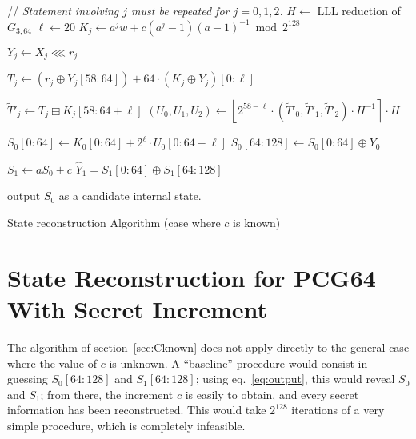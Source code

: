 \documentclass[submission,svgnames,journal=tosc]{iacrtrans}
\begin{document}
\begin{algorithm}
\begin{algorithmic}[1]
  \State // \emph{Statement involving $j$ must be repeated for $j=0, 1, 2$.}
  \State $H \gets$ LLL reduction of $G_{3,64}$
  \State $\ell \gets 20$
   
    \State $K_j \gets a^j w + c (a^j - 1)(a-1)^{-1} \bmod 2^{128}$    
    
     
    
    \State $Y_j \gets X_j \lll r_j$ 
    
    \State $T_j \gets \left(r_j \oplus Y_j[58:64]\right) +  64 \cdot \left(K_j \oplus Y_j\right)[0:\ell]$  
    
    \State $\widetilde T'_j \gets T_j \boxminus K_j[58:64+\ell]$  
    \State $(U_0, U_1, U_2) \gets \left\lfloor 2^{58-\ell} \cdot (\widetilde T'_0, \widetilde T'_1, \widetilde T'_2) \cdot  H^{-1} \right\rceil \cdot H$ 

    \State $S_0[0:64] \gets  K_0[0:64] + 2^{\ell} \cdot U_0[0:64-\ell]$ 
    \State $S_0[64:128] \gets S_0[0:64] \oplus Y_0$ 
    
    \State $S_1 \gets a  S_0 + c$ 
    \State $\widehat{Y}_1 =  S_1[0:64] \oplus  S_1[64:128]$
    
     
    \State output $S_0$ as a candidate internal state.
    \EndIf
    \EndFor
    \EndFor
    \EndProcedure
  \end{algorithmic}
  \caption{State reconstruction Algorithm (case where $c$ is known)}
  \label{algo:known}
\end{algorithm}
  
\section{State Reconstruction for \textsf{PCG64} With Secret Increment}
\label{sec:Cunknown}

The algorithm of section~\ref{sec:Cknown} does not apply directly to the general
case where the value of $c$ is unknown. A ``baseline'' procedure would consist
in guessing $S_0[64:128]$ and $S_1[64:128]$; using eq.~\eqref{eq:output}, this
would reveal $S_0$ and $S_1$; from there, the increment $c$ is easily to obtain,
and every secret information has been reconstructed. This would take $2^{128}$
iterations of a very simple procedure, which is completely infeasible.
\end{document}
